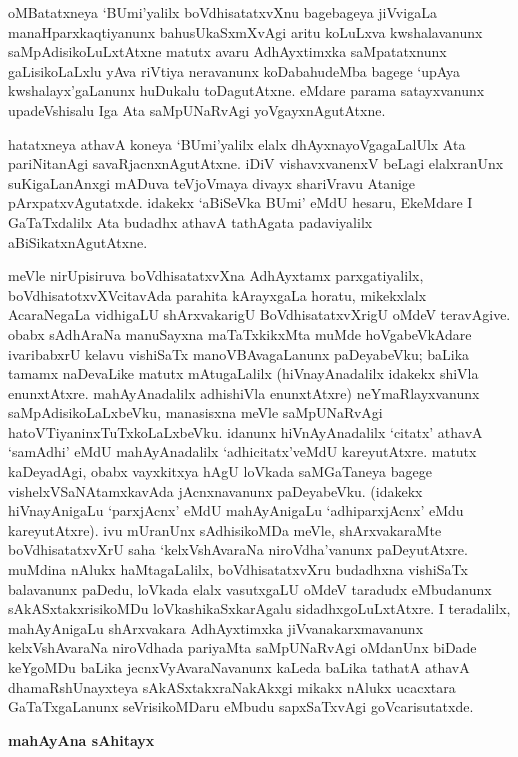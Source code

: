 oMBatatxneya `BUmi'yalilx boVdhisatatxvXnu bagebageya jiVvigaLa manaHparxkaqti\-yanunx bahusUkaSxmXvAgi aritu koLuLxva kwshalavanunx saMpAdisikoLuLxtAtxne matutx avaru AdhAyxtimxka saMpatatxnunx gaLisikoLaLxlu yAva riVtiya neravanunx koDabahudeMba bagege `upAya kwshalayx'gaLanunx huDukalu toDagutAtxne. eMdare parama satayxvanunx upadeVshisalu Iga Ata saMpUNaRvAgi yoVgayxnAgutAtxne.

hatatxneya athavA koneya `BUmi'yalilx elalx dhAyxnayoVgagaLalUlx Ata pariNitanAgi savaRjacnxnAgutAtxne. iDiV vishavxvanenxV beLagi elalxranUnx suKigaLanAnxgi mADuva teVjoVmaya divayx shariVravu Atanige pArxpatxvAgutatxde. idakekx `aBiSeVka BUmi' eMdU hesaru, EkeMdare I GaTaTxdalilx Ata budadhx athavA tathAgata padaviyalilx aBiSikatxnAgutAtxne.

meVle nirUpisiruva boVdhisatatxvXna AdhAyxtamx parxgatiyalilx, boVdhisatotxvXVcitavAda parahita kArayxgaLa horatu, mikekxlalx AcaraNegaLa vidhigaLU shArxvakarigU BoVdhisatatxvXrigU oMdeV teravAgive. obabx sAdhAraNa manuSayxna maTaTxkikxMta muMde hoVgabeVkAdare ivaribabxrU kelavu vishiSaTx manoVBAvagaLanunx paDeyabeVku; baLika tamamx naDevaLike matutx mAtugaLalilx (hiVnayAnadalilx idakekx shiVla enunxtAtxre. mahAyAnadalilx adhi\-shiVla enunxtAtxre) neYmaRlayxvanunx saMpAdisikoLaLxbeVku, manasisxna meVle saMpUNaR\-vAgi hatoVTiyaninxTuTxkoLaLxbeVku. idanunx hiVnAyAnadalilx `citatx' athavA `samAdhi' eMdU mahAyAnadalilx `adhicitatx'veMdU kareyutAtxre. matutx kaDeyadAgi, obabx vayxkitxya hAgU loVkada saMGaTaneya bagege vishelxVSaNAtamxkavAda jAcnxnavanunx paDeya\-beVku. (idakekx hiVnayAni\-gaLu `parxjAcnx' eMdU mahAyAnigaLu `adhiparxjAcnx' eMdu kareyutAtxre). ivu mUranUnx sAdhisikoMDa meVle, shArxvakaraMte boVdhisatatxvXrU saha `kelxVshAvaraNa niroVdha'vanunx paDeyutAtxre. muMdina nAlukx haMtagaLalilx, boVdhi\-satatxvXru \hbox{budadhxna} vishiSaTx balavanunx paDedu, loVkada elalx vasutxgaLU oMdeV taradudx eMbudanunx sAkASx\-takxrisikoMDu loVkashikaSxkarAgalu sidadhxgoLuLxtAtxre. I teradalilx, mahA\-yAnigaLu shArxvakara AdhAyxtimxka jiVvanakarxmavanunx kelxVshAvaraNa niroVdhada pariyaMta saMpUNaR\-vAgi oMdanUnx biDade keYgoMDu baLika jecnxVyAvaraNavanunx kaLeda baLika tathatA athavA dhamaRshUnayxteya sAkASxtakxraNakAkxgi mikakx nAlukx ucacxtara GaTaTx\-gaLanunx seVrisikoMDaru eMbudu sapxSaTxvAgi goVcarisutatxde.

\begin{center}
{\textbf{\Large mahAyAna sAhitayx}}
\end{center}

